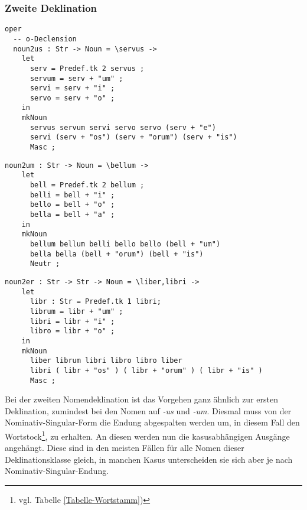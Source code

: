 \subsubsection{Zweite Deklination}
\begin{lstlisting}[float=h!tp,caption={Die Deklinationsfunktionen für die Nomen der zweiten Deklination auf \textit{-us}},label={GF-Morpho-Noun2us},basicstyle=\small]
oper
  -- o-Declension
  noun2us : Str -> Noun = \servus ->
    let
      serv = Predef.tk 2 servus ;
      servum = serv + "um" ;
      servi = serv + "i" ;
      servo = serv + "o" ;
    in
    mkNoun 
      servus servum servi servo servo (serv + "e")
      servi (serv + "os") (serv + "orum") (serv + "is")
      Masc ;
\end{lstlisting}
\begin{lstlisting}[float=h!tp,caption={Die Deklinationsfunktionen für die Nomen der zweiten Deklination auf \textit{-um}},label={GF-Morpho-Noun2um},basicstyle=\small]
  noun2um : Str -> Noun = \bellum ->
    let
      bell = Predef.tk 2 bellum ;
      belli = bell + "i" ;
      bello = bell + "o" ;
      bella = bell + "a" ;
    in
    mkNoun 
      bellum bellum belli bello bello (bell + "um")
      bella bella (bell + "orum") (bell + "is")
      Neutr ;
\end{lstlisting}
\begin{lstlisting}[float=h!tp,caption={Die Deklinationsfunktionen für die Nomen der zweiten Deklination auf \textit{-er}},label={GF-Morpho-Noun2er},basicstyle=\small]
  noun2er : Str -> Str -> Noun = \liber,libri ->
    let
      libr : Str = Predef.tk 1 libri;
      librum = libr + "um" ;
      libri = libr + "i" ;
      libro = libr + "o" ;
    in
    mkNoun 
      liber librum libri libro libro liber
      libri ( libr + "os" ) ( libr + "orum" ) ( libr + "is" )
      Masc ;
\end{lstlisting}
Bei der zweiten Nomendeklination ist das Vorgehen ganz ähnlich zur ersten Deklination, zumindest bei den Nomen auf \textit{-us} und \textit{-um}. Diesmal muss von der Nominativ-Singular-Form die Endung abgespalten werden um, in diesem Fall den Wortstock\footnote{vgl. Tabelle \ref{Tabelle-Wortstamm})}, zu erhalten. An diesen werden nun die kasusabhängigen Ausgänge angehängt. Diese sind in den meisten Fällen für alle Nomen dieser Deklinationsklasse gleich, in manchen Kasus unterscheiden sie sich aber je nach Nominativ-Singular-Endung. \par
